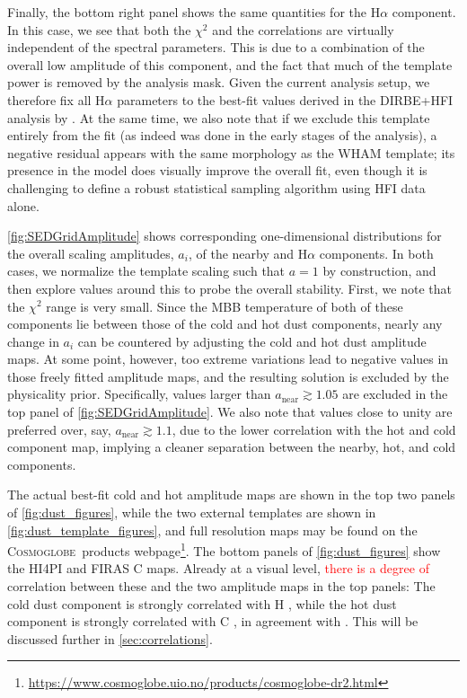 \documentclass{aa}
\makeatletter
\DeclareRobustCommand{\ion}[2]{%
\relax\ifmmode
\ifx\testbx\f@series
{\mathbf{#1\,\mathsc{#2}}}\else
{\mathrm{#1\,\mathsc{#2}}}\fi
\else\textup{#1\,{\mdseries\textsc{#2}}}%
\fi}
\newcommand{\mathsc}[1]{{\normalfont\textsc{#1}}}
\def\cosmoglobe{\textsc{Cosmoglobe}}
\def\,{\thinspace}
\newcommand{\edit}[1]{\textcolor{red}{#1}}
\makeatother
\begin{document}
Finally, the bottom right panel shows the same quantities for the H$\alpha$ component. In this case, we see that both the $\chi^2$ and the correlations are virtually independent of the spectral parameters. This is due to a combination of the overall low amplitude of this component, and the fact that much of the template power is removed by the analysis mask. Given the current analysis setup, we therefore fix all H$\alpha$ parameters to the best-fit values derived in the DIRBE+HFI analysis by \citet{CG02_05}. At the same time, we also note that if we exclude this template entirely from the fit (as indeed was done in the early stages of the analysis), a negative residual appears with the same morphology as the WHAM template; its presence in the model does visually improve the overall fit, even though it is challenging to define a robust statistical sampling algorithm using HFI data alone.

\cref{fig:SEDGridAmplitude} shows corresponding one-dimensional distributions for the overall scaling amplitudes, $a_i$, of the nearby and H$\alpha$ components. In both cases, we normalize the template scaling such that $a=1$ by construction, and then explore values around this to probe the overall stability. First, we note that the $\chi^2$ range is very small. Since the MBB temperature of both of these components lie between those of the cold and hot dust components, nearly any change in $a_i$  can be countered by adjusting the cold and hot dust amplitude maps. At some point, however, too extreme variations lead to negative values in those freely fitted amplitude maps, and the resulting solution is excluded by the physicality prior. Specifically, values larger than $a_{\mathrm{near}} \gtrsim 1.05$ are excluded in the top panel of \cref{fig:SEDGridAmplitude}. We also note that values close to unity are preferred over, say, $a_{\mathrm{near}} \gtrsim 1.1$, due to the lower correlation with the hot and cold component map, implying a cleaner separation between the nearby, hot, and cold components.

The actual best-fit cold and hot amplitude maps are shown in the top two panels of \cref{fig:dust_figures}, while the two external templates are shown in \cref{fig:dust_template_figures}, and full resolution maps may be found on the \cosmoglobe\ products webpage\footnote{\href{https://www.cosmoglobe.uio.no/products/cosmoglobe-dr2.html}{https://www.cosmoglobe.uio.no/products/cosmoglobe-dr2.html}}. The bottom panels of \cref{fig:dust_figures} show the HI4PI and FIRAS \ion{C}{ii} maps. Already at a visual level, \edit{there is a degree of} correlation between these and the two amplitude maps in the top panels: 
The cold dust component is strongly correlated with \ion{H}{i}, while the hot dust component is strongly correlated with \ion{C}{ii}, in agreement with \citet{CG02_05}. This will be discussed further in \cref{sec:correlations}. 
\end{document}
